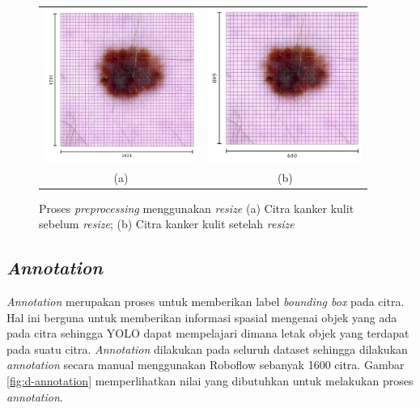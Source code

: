    \begin{figure}[H]
        \centering
        \begin{tabular}{cc}
            \includegraphics[width=5cm]{img/bab4/resize-1024.png}
            &
            \includegraphics[width=5cm]{img/bab4/resize-640.png} \\
            (a)
            &
            (b) \\
        \end{tabular}
        \caption{Proses \textit{preprocessing} menggunakan \textit{resize} (a) Citra kanker kulit sebelum \textit{resize}; (b) Citra kanker kulit setelah \textit{resize}}
        \label{fig:d-resized}
    \end{figure}

    

    \subsection{\textit{Annotation}}
    \textit{Annotation} merupakan proses untuk memberikan label \textit{bounding box} pada citra. Hal ini berguna untuk memberikan informasi spasial mengenai objek yang ada pada citra sehingga YOLO dapat mempelajari dimana letak objek yang terdapat pada suatu citra. \textit{Annotation} dilakukan pada seluruh dataset sehingga dilakukan \textit{annotation} secara manual menggunakan Roboflow sebanyak 1600 citra. Gambar \ref{fig:d-annotation} memperlihatkan nilai yang dibutuhkan untuk melakukan proses \textit{annotation}.

